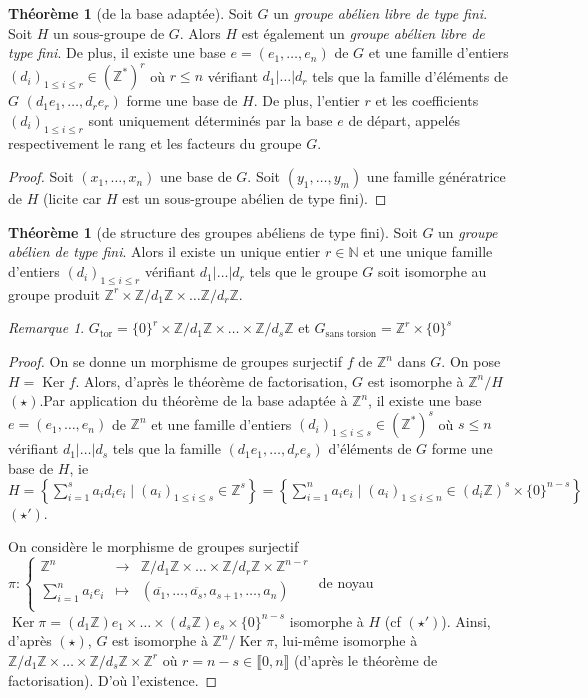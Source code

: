\documentclass{report}
\newcommand{\Z}{\mathbb{Z}}
\newcommand{\N}{\mathbb{N}}
\renewcommand{\ker}{\mathop{\mathrm{Ker}}\nolimits}
\newcommand{\Gt}{G_{\mathrm{tor}}}
\newcommand{\dis}{\displaystyle}
\newcommand{\nt}[1]{\llbracket  #1 \rrbracket }
\theoremstyle{definition}
\newtheorem{theo}[defi]{Théorème}
\theoremstyle{remark}
\newtheorem{rem}[defi]{Remarque}
\newcommand{\app}[5]{#1:\left\{\begin{array}{ccl}
#2 & \longrightarrow & #3 \\
#4 & \longmapsto & #5  \\
\end{array}\right.
}
\begin{document}
\begin{theo}[de la base adaptée]
Soit $G$ un \textit{groupe abélien libre de type fini}. Soit $H$ un sous-groupe de $G$. Alors $H$ est également un \textit{groupe abélien libre de type fini}. De plus, il existe une base $e=(e_1, \ldots, e_n)$ de $G$ et une famille d'entiers $(d_i)_{1 \leqslant i \leqslant r} \in (\Z^*)^r$ où $r \leqslant n$ vérifiant $d_1 \vert \ldots \vert d_r$ tels que la famille d'éléments de $G$ $(d_1e_1, \ldots, d_re_r)$ forme une base de $H$. De plus, l'entier $r$ et les coefficients $(d_i)_{1 \leqslant i \leqslant r}$ sont uniquement déterminés par la base $e$ de départ, appelés respectivement le rang et les facteurs du groupe $G$.
\end{theo}

\begin{proof}
Soit $(x_1, \ldots, x_n)$ une base de $G$. Soit $(y_1, \ldots, y_m)$ une famille génératrice de $H$ (licite car $H$ est un sous-groupe abélien de type fini). 
\end{proof}

\begin{theo}[de structure des groupes abéliens de type fini]
Soit $G$ un \textit{groupe abélien de type fini}. Alors il existe un unique entier $r \in \N$ et une unique famille d'entiers $(d_i)_{1 \leqslant i \leqslant r}$ vérifiant $d_1 \vert \ldots \vert d_r$ tels que le groupe $G$ soit isomorphe au groupe produit $\Z^r \times \Z/d_1\Z \times \ldots \Z/d_r\Z$. 
\end{theo}

\begin{rem}
$\Gt=\{0\}^r \times \Z/d_1\Z \times \ldots \times \Z/d_s\Z$ et $G_{\textrm{sans torsion}}=\Z^r \times \{0\}^{s}$ 
\end{rem}

\begin{proof}
On se donne un morphisme de groupes surjectif $f$ de $\Z^n$ dans $G$. On pose $H=\ker f$. Alors, d'après le théorème de factorisation, $G$ est isomorphe à $\Z^n/H$ $(\star)$.Par application du théorème de la base adaptée à $\Z^n$, il existe une base $e=(e_1, \ldots, e_n)$ de $\Z^n$ et une famille d'entiers $(d_i)_{1 \leqslant i \leqslant s} \in (\Z^*)^s$ où $s \leqslant n$ vérifiant $d_1 \vert \ldots \vert d_s$ tels que la famille $(d_1e_1, \ldots, d_re_s)$ d'éléments de $G$ forme une base de $H$, ie $H=\left\{\dis \sum_{i=1}^s a_id_ie_i \mid (a_i)_{1 \leqslant i \leqslant s} \in \Z^s \right\}=\left\{\dis \sum_{i=1}^n a_ie_i \mid (a_i)_{1 \leqslant i \leqslant n} \in (d_i\Z)^s\times\{0\}^{n-s} \right\}$ $(\star ')$. 

On considère le morphisme de groupes surjectif $\app{\pi}{\Z^n}{\Z/d_1\Z \times \ldots \times \Z/d_r\Z \times \Z^{n-r}}{\dis \sum_{i=1}^na_ie_i}{(\overline{a_1}, \ldots, \overline{a_s},a_{s+1}, \ldots, a_n)}$ de noyau $\ker \pi=(d_1\Z )e_1 \times \ldots \times (d_s\Z)e_s \times \{0\}^{n-s}$ isomorphe à $H$ (cf $(\star ')$). 
Ainsi, d'après $(\star)$, $G$ est isomorphe à $\Z^n/\ker \pi$, lui-même isomorphe à $\Z/d_1\Z \times \ldots \times \Z/d_s\Z \times \Z^{r}$ où $r=n-s \in \nt{0,n}$ (d'après le théorème de factorisation). D'où l'existence. 
\end{proof}
\end{document}
